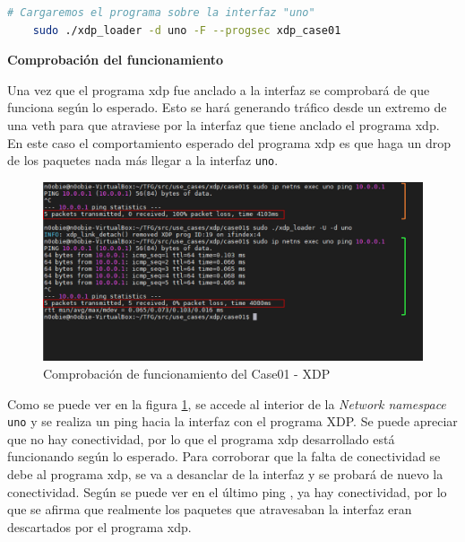 \begin{lstlisting}[language= bash, style=Consola, caption={Carga del programa XDP - Case01},label=code:case01_xdp_ether_load]
    # Cargaremos el programa sobre la interfaz "uno" 
    sudo ./xdp_loader -d uno -F --progsec xdp_case01
\end{lstlisting}

\vspace{1cm}
\textbf{Comprobación del funcionamiento}\\
\par

Una vez que el programa \gls{xdp} fue anclado a la interfaz se comprobará de que funciona según lo esperado. Esto se hará generando tráfico desde un extremo de una \gls{veth} para que atraviese por la interfaz que tiene anclado el programa \gls{xdp}. En este caso el comportamiento esperado del programa \gls{xdp} es que haga un drop de los paquetes nada más llegar a la interfaz \texttt{uno}.

\begin{figure}[ht]
    \centering
    \includegraphics[width=15.5cm]{archivos/img/dev/xdp/case01/demo_case01_edited.png}
    \caption{Comprobación de funcionamiento del Case01 - XDP}
    \label{fig:case01_xdp_ether_func}
\end{figure}

Como se puede ver en la figura \ref{fig:case01_xdp_ether_func}, se accede al interior de la \textit{Network namespace} \texttt{uno} y se realiza un ping \hspace{1mm}  hacia la interfaz con el programa XDP. Se puede apreciar que no hay conectividad, por lo que el programa \gls{xdp} desarrollado está funcionando según lo esperado. Para corroborar que la falta de conectividad se debe al programa \gls{xdp}, se va a desanclar de la interfaz y se probará de nuevo la conectividad. Según se puede ver en el último ping  , ya hay conectividad, por lo que se afirma que realmente los paquetes que atravesaban la interfaz eran descartados por el programa \gls{xdp}. \newpage




